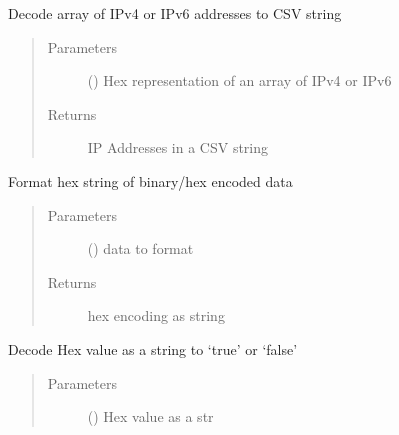\documentclass[letterpaper,10pt,english]{sphinxmanual}
\begin{document}
\begin{fulllineitems}
\begin{fulllineitems}
\label{\detokenize{dhcp_decode-class:bloxone.dhcp_decode.hex_to_array_of_ip}}
\sphinxAtStartPar
Decode array of IPv4 or IPv6 addresses to CSV string
\begin{quote}\begin{description}
\item[{Parameters}] \leavevmode
\sphinxAtStartPar
{} () \textendash{} Hex representation of an array of IPv4 or IPv6

\item[{Returns}] \leavevmode
\sphinxAtStartPar
IP Addresses in a CSV string

\end{description}\end{quote}

\end{fulllineitems}


\begin{fulllineitems}
\label{\detokenize{dhcp_decode-class:bloxone.dhcp_decode.hex_to_binary}}
\sphinxAtStartPar
Format hex string of binary/hex encoded data
\begin{quote}\begin{description}
\item[{Parameters}] \leavevmode
\sphinxAtStartPar
{} () \textendash{} data to format

\item[{Returns}] \leavevmode
\sphinxAtStartPar
hex encoding as string

\end{description}\end{quote}

\end{fulllineitems}


\begin{fulllineitems}
\label{\detokenize{dhcp_decode-class:bloxone.dhcp_decode.hex_to_boolean}}
\sphinxAtStartPar
Decode Hex value as a string to ‘true’ or ‘false’
\begin{quote}\begin{description}
\item[{Parameters}] \leavevmode
\sphinxAtStartPar
{} () \textendash{} Hex value as a str


\end{description}
\end{quote}
\end{fulllineitems}
\end{fulllineitems}
\end{document}
